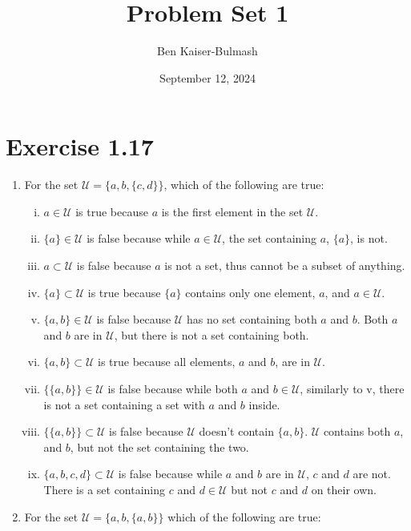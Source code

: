 \documentclass{article}
\title{Problem Set 1}
\author{Ben Kaiser-Bulmash}
\date{September 12, 2024}
\begin{document}
\maketitle

\section*{Exercise 1.17}
\begin{enumerate}[1]
    \item For the set $\mathscr{U} = \{a, b, \{c, d\}\}$, which of the following are true:
    \begin{enumerate}[i.]
        \item $a \in \mathscr{U}$ is true because $a$ is the first element in the set $\mathscr{U}$.
        \item $\{a\} \in \mathscr{U}$ is false because while $a \in \mathscr{U}$, the set containing $a$, $\{a\}$, is not.
        \item $a \subset \mathscr{U}$ is false because $a$ is not a set, thus cannot be a subset of anything.
        \item $\{a\} \subset \mathscr{U}$ is true because $\{a\}$ contains only one element, $a$, and $a \in \mathscr{U}$.
        \item $\{a, b\} \in \mathscr{U}$ is false because $\mathscr{U}$ has no set containing both $a$ and $b$. Both $a$ and $b$ are in $\mathscr{U}$, but there is not a set containing both.
        \item $\{a, b\} \subset \mathscr{U}$ is true because all elements, $a$ and $b$, are in $\mathscr{U}$.
        \item $\{\{a,b\}\} \in \mathscr{U}$ is false because while both $a$ and $b \in \mathscr{U}$, similarly to v, there is not a set containing a set with $a$ and $b$ inside.
        \item $\{\{a,b\}\} \subset \mathscr{U}$ is false because $\mathscr{U}$ doesn't contain $\{a, b\}$. $\mathscr{U}$ contains both $a$, and $b$, but not the set containing the two. 
        \item $\{a, b, c, d\} \subset \mathscr{U}$ is false because while $a$ and $b$ are in $\mathscr{U}$, $c$ and $d$ are not. There is a set containing $c$ and $d \in \mathscr{U}$ but not $c$ and $d$ on their own. 
    \end{enumerate}
    \setcounter{enumi}{2}
    \item For the set $\mathscr{U} = \{a, b, \{a, b\}\}$ which of the following are true:
    \begin{enumerate}[i.]

\end{enumerate}
\end{enumerate}
\end{document}

